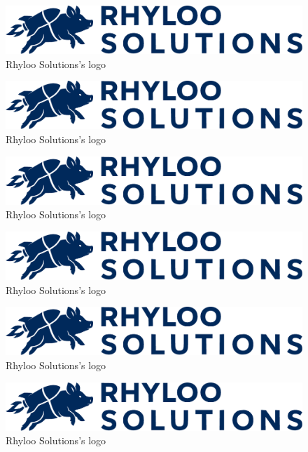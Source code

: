 \documentclass[english]{reporti}
\begin{document}
\begin{figure}[htbp]
\centering
\includegraphics[fbox,width=.9\linewidth]{./figures/logo/rhyloo_solutions_horizontal.pdf}
\caption{Rhyloo Solutions's logo}
\end{figure}
\begin{figure}[htbp]
\centering
\includegraphics[fbox,width=.9\linewidth]{./figures/logo/rhyloo_solutions_horizontal.pdf}
\caption{Rhyloo Solutions's logo}
\end{figure}
\begin{figure}[htbp]
\centering
\includegraphics[fbox,width=.9\linewidth]{./figures/logo/rhyloo_solutions_horizontal.pdf}
\caption{Rhyloo Solutions's logo}
\end{figure}
\begin{figure}[htbp]
\centering
\includegraphics[fbox,width=.9\linewidth]{./figures/logo/rhyloo_solutions_horizontal.pdf}
\caption{Rhyloo Solutions's logo}
\end{figure}
\begin{figure}[htbp]
\centering
\includegraphics[fbox,width=.9\linewidth]{./figures/logo/rhyloo_solutions_horizontal.pdf}
\caption{Rhyloo Solutions's logo}
\end{figure}
\begin{figure}[htbp]
\centering
\includegraphics[fbox,width=.9\linewidth]{./figures/logo/rhyloo_solutions_horizontal.pdf}
\caption{Rhyloo Solutions's logo}
\end{figure}
\end{document}
